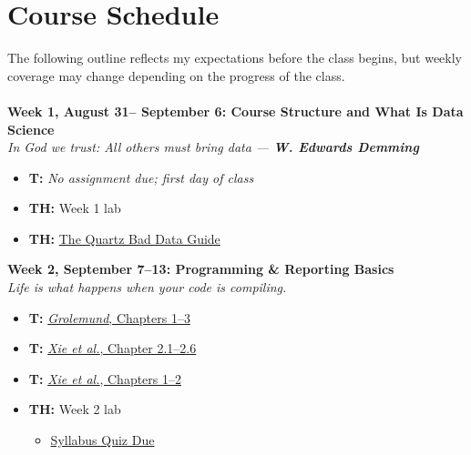 \documentclass[11pt]{article}
\begin{document}
\section{Course Schedule}
The following outline reflects my expectations before the class begins, but weekly coverage may change depending on the progress of the class. 
\\\\
\textbf{Week 1, August 31-- September 6: Course Structure and What Is Data Science}
\\ \textit{In God we trust: All others must bring data --- \textbf{W. Edwards Demming}}
\begin{itemize}
\item \textbf{T:} \textit{No assignment due; first day of class}
\item \textbf{TH:} Week 1 lab
\item \textbf{TH:} \href{https://github.com/Quartz/bad-data-guide}{The Quartz Bad Data Guide} 
\end{itemize}
\vspace{1em}
\textbf{Week 2, September 7--13: Programming \& Reporting Basics}
\\
\textit{Life is what happens when your code is compiling.}
\begin{itemize}
\item \textbf{T:} \href{https://rstudio-education.github.io/hopr/basics.html}{\textit{Grolemund}, Chapters 1--3} 
\item \textbf{T:} \href{https://bookdown.org/yihui/rmarkdown/basics.html}{\textit{Xie et al.}, Chapter 2.1--2.6} 
\item \textbf{T:} \href{https://bookdown.org/yihui/blogdown/}{\textit{Xie et al.}, Chapters 1--2}
\item \textbf{TH:} Week 2 lab
\begin{itemize}
\item \underline{Syllabus Quiz Due}
\end{itemize} 
\end{itemize}
\vspace{1em}
\end{document}
